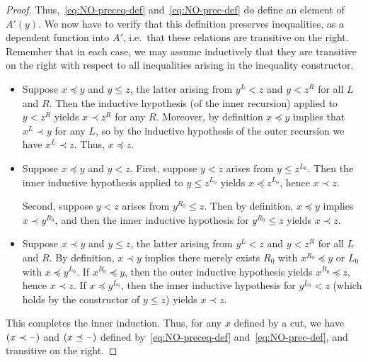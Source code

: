 \begin{proof}
  Thus,~\eqref{eq:NO-preceq-def} and~\eqref{eq:NO-prec-def} do define an element of $A'(y)$.
  We now have to verify that this definition preserves inequalities, as a dependent function into $A'$, i.e.\ that these relations are transitive on the right.
  Remember that in each case, we may assume inductively that they are transitive on the right with respect to all inequalities arising in the inequality constructor.
  \begin{itemize}
  \item Suppose $x\preceq y$ and $y\le z$, the latter arising from $y^L<z$ and $y<z^R$ for all $L$ and $R$.
    Then the inductive hypothesis (of the inner recursion) applied to $y<z^R$ yields $x\prec z^R$ for any $R$.
    Moreover, by definition $x\preceq y$ implies that $x^L \prec y$ for any $L$, so by the inductive hypothesis of the outer recursion we have $x^L \prec z$.
    Thus, $x\preceq z$.
  \item Suppose $x\preceq y$ and $y<z$.
    First, suppose $y<z$ arises from $y\le z^{L_0}$.
    Then the inner inductive hypothesis applied to $y\le z^{L_0}$ yields $x \preceq z^{L_0}$, hence $x\prec z$.

    Second, suppose $y<z$ arises from $y^{R_0}\le z$.
    Then by definition, $x\preceq y$ implies $x\prec y^{R_0}$, and then the inner inductive hypothesis for $y^{R_0}\le z$ yields $x\prec z$.
  \item Suppose $x\prec y$ and $y\le z$, the latter arising from $y^L<z$ and $y<z^R$ for all $L$ and $R$.
    By definition, $x\prec y$ implies there merely exists $R_0$ with $x^{R_0}\preceq y$ or $L_0$ with $x\preceq y^{L_0}$.
    If $x^{R_0}\preceq y$, then the outer inductive hypothesis yields $x^{R_0}\preceq z$, hence $x\prec z$.
    If $x\preceq y^{L_0}$, then the inner inductive hypothesis for $y^{L_0}<z$ (which holds by the constructor of $y\le z$) yields $x\prec z$.

  \end{itemize}
  This completes the inner induction.
  Thus, for any $x$ defined by a cut, we have $(x\prec \mathord{\hspace{1pt}\text{--}\hspace{1pt}})$ and $(x\preceq \mathord{\hspace{1pt}\text{--}\hspace{1pt}})$ defined by~\eqref{eq:NO-preceq-def} and~\eqref{eq:NO-prec-def}, and transitive on the right.


\end{proof}
